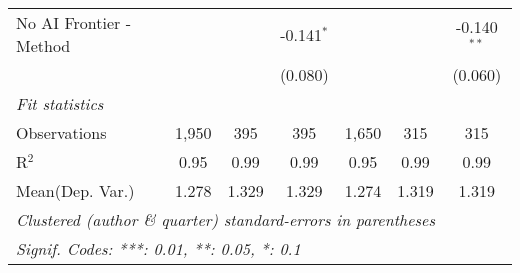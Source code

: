\begin{tabular}{lcccccc}
   No AI Frontier - Method &         &                & -0.141$^{*}$   &         &               & -0.140$^{**}$\\   
                           &         &                & (0.080)        &         &               & (0.060)\\   
   \midrule
   \emph{Fit statistics}\\
   Observations            & 1,950   & 395            & 395            & 1,650   & 315           & 315\\  
   R$^2$                   & 0.95    & 0.99           & 0.99           & 0.95    & 0.99          & 0.99\\  
Mean(Dep. Var.) & 1.278 & 1.329 & 1.329 & 1.274 & 1.319 & 1.319 \\
   \midrule \midrule
   \multicolumn{7}{l}{\emph{Clustered (author \& quarter) standard-errors in parentheses}}\\
   \multicolumn{7}{l}{\emph{Signif. Codes: ***: 0.01, **: 0.05, *: 0.1}}\\
\end{tabular}
\par\endgroup
